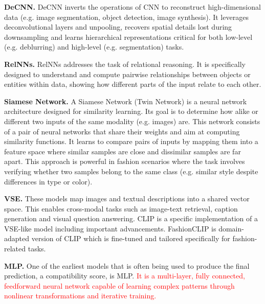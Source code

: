 \vspace{0.5cm}

\textbf{\ac{DeCNN}.}
\acs{DeCNN} inverts the operations of \acs{CNN} to reconstruct high-dimensional data (e.g. image segmentation, object detection, image synthesis). It leverages deconvolutional layers and unpooling, recovers spatial details lost during downsampling and learns hierarchical representations critical for both low-level (e.g. deblurring) and high-level (e.g. segmentation) tasks. \cite[cf.]{zeiler_deconvolutional_2010}

\vspace{0.5cm}

\textbf{\ac{RelNNs}.}
\acs{RelNNs} addresses the task of relational reasoning. It is specifically designed to understand and compute pairwise relationships between objects or entities within data, showing how different parts of the input relate to each other. \cite[cf.]{sung_learning_2018}

\vspace{0.5cm}

\textbf{Siamese Network.}
A Siamese Network (Twin Network) is a neural network architecture designed for similarity learning. Its goal is to determine how alike or different two inputs of the same modality (e.g. images) are. This network consists of a pair of neural networks that share their weights and aim at computing similarity functions. It learns to compare pairs of inputs by mapping them into a feature space where similar samples are close and dissimilar samples are far apart. This approach is powerful in fashion scenarios where the task involves verifying whether two samples belong to the same class (e.g. similar style despite differences in type or color). \cite[cf.]{koch_siamese_2015}

\vspace{0.5cm}

\textbf{\ac{VSE}.}
These models map images and textual descriptions into a shared vector space. This enables cross-modal tasks such as image-text retrieval, caption generation and visual question answering. \acs{CLIP} is a specific implementation of a \acs{VSE}-like model including important advancements. Fashion\acs{CLIP} is domain-adapted version of \acs{CLIP} which is fine-tuned and tailored specifically for fashion-related tasks. \cite[cf.]{faghri_vse_2018}

\vspace{0.5cm}

\textbf{\ac{MLP}.}
One of the earliest models that is often being used to produce the final prediction, a compatibility score, is \acs{MLP}. \textcolor{red}{It is a multi-layer, fully connected, feedforward neural network capable of learning complex patterns through nonlinear transformations and iterative training.} \cite[cf.]{upgrad_overview_2023}

